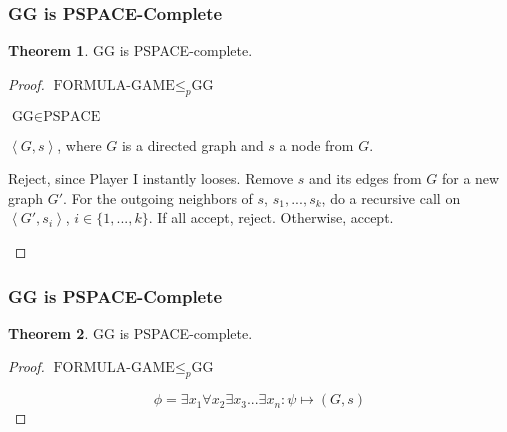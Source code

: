 \documentclass[notheorems]{beamer}
\theoremstyle{definition}
\newtheorem{theorem}{Theorem}
\theoremstyle{remark}
\newcommand{\pspaceclass}{\text{PSPACE}}
\newcommand{\formulagameprob}{\text{FORMULA-GAME}}
\newcommand{\ggprob}{\text{GG}}
\newcommand{\lpp}{\left \langle}
\newcommand{\rpp}{\right \rangle}
\newcommand{\enc}[1]{\lpp #1 \rpp}
\renewcommand{\qedsymbol}{\(\blacksquare\)}
\begin{document}
\begin{frame}
    \frametitle{GG is PSPACE-Complete}

    \begin{theorem}
        \(\ggprob\) is PSPACE-complete.
    \end{theorem}

    \begin{proof} \(\formulagameprob \leq_p \ggprob\)

        \(\ggprob \in \pspaceclass\)
        \begin{description}
            \scriptsize
            \item[Input:] \(\enc{G, s}\), where \(G\) is a directed graph and \(s\) a node from \(G\).
            \item[Function:] \phantom{}
                \begin{algorithmic}[1]
                        \State Reject, since Player I instantly looses.
                    \EndIf
                    \State Remove \(s\) and its edges from \(G\) for a new graph \(G'\).
                    \State For the outgoing neighbors of \(s\), \(s_1, ..., s_k\), do a recursive call on \(\enc{G', s_i}\), \(i \in \{1,...,k\}\).
                    \State If all accept, reject. Otherwise, accept.
                \end{algorithmic}
        \end{description}
        \renewcommand{\qedsymbol}{}
    \end{proof}

\end{frame}

\begin{frame}
    \frametitle{GG is PSPACE-Complete}

    \begin{theorem}
        \(\ggprob\) is PSPACE-complete.
    \end{theorem}

    \begin{proof} \(\formulagameprob \leq_p \ggprob\)

        \[\phi = \exists x_1 \forall x_2 \exists x_3 ... \exists x_n\colon \psi \mapsto (G, s)\]
        \renewcommand{\qedsymbol}{}

    \end{proof}

\end{frame}
\end{document}
